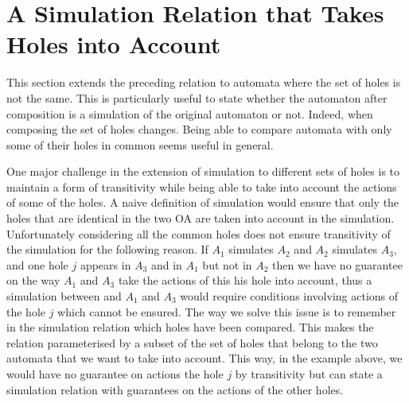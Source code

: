 \documentclass[runningheads]{llncs}
\begin{document}






\section{A Simulation Relation that Takes Holes into Account}\label{sec:holes}

This section  extends the preceding relation to automata where the set of holes is not the same. 
This is particularly useful  to state whether the automaton after composition is a simulation of the original automaton or not.
Indeed, when composing the set of  holes changes.
Being able to compare automata with only some of their holes in common seems useful in general.

\medskip
One major challenge in the extension of simulation to different sets of holes is to maintain a form of transitivity while being able to take into account the actions of some of the holes. A naive definition of simulation would ensure that only the holes that are identical in the two OA are taken into account in the simulation. Unfortunately considering all the common holes does not ensure transitivity of the simulation for the following reason. If $A_1$ simulates $A_2$ and $A_2$ simulates $A_3$, and one hole $j$ appears in $A_3$ and in $A_1$ but not in $A_2$ then we have no guarantee on the way $A_1$ and $A_3$ take the actions of this his hole into account, thus  a simulation between and $A_1$ and $A_3$ would require conditions involving actions of the hole $j$ which cannot be ensured. The way we solve this issue is to remember in the simulation relation which holes have been compared. This makes the relation parameterised by a subset of the set of holes that belong to the two automata that we want to take into account.
This way, in the example above, we would have no guarantee on actions the hole $j$ by transitivity but can state a simulation relation with guarantees on the actions of the other holes.
\end{document}

